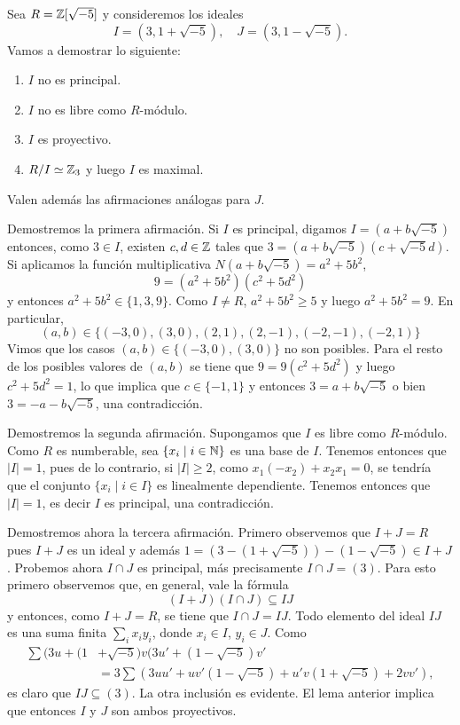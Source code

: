 \begin{example}
	Sea $R=\mathbb{Z}[\sqrt{-5}]$ y consideremos los ideales 
	\[
		I=(3,1+\sqrt{-5}),\quad 
		J=(3,1-\sqrt{-5}).
	\]
	Vamos a demostrar lo siguiente:
	\begin{enumerate}
		\item $I$ no es principal.
		\item $I$ no es libre como $R$-módulo.
		\item $I$ es proyectivo.
		\item $R/I\simeq\mathbb{Z}_3$ y luego $I$ es maximal.
	\end{enumerate}
	Valen además las afirmaciones análogas para $J$.

	Demostremos la primera afirmación. Si $I$ es principal, digamos $I=(a+b\sqrt{-5})$ entonces,
	como $3\in I$, existen $c,d\in\mathbb{Z}$ tales que
	$3=(a+b\sqrt{-5})(c+\sqrt{-5}d)$.  Si aplicamos la función multiplicativa 
	$N(a+b\sqrt{-5})=a^2+5b^2$,
	\[
	9=(a^2+5b^2)(c^2+5d^2)
	\]
	y entonces $a^2+5b^2\in\{1,3,9\}$. Como $I\ne R$,  
	$a^2+5b^2\geq5$ y luego $a^2+5b^2=9$. En particular,
	\[
	(a,b)\in\{(-3,0),(3,0),(2,1),(2,-1),(-2,-1),(-2,1)\}
	\]
	Vimos que los casos $(a,b)\in\{(-3,0),(3,0)\}$ no son posibles. Para el resto de los posibles valores de $(a,b)$ 
	se tiene que 
	$9=9(c^2+5d^2)$ y luego $c^2+5d^2=1$, lo que implica que $c\in\{-1,1\}$ y entonces 
	$3=a+b\sqrt{-5}$ o bien $3=-a-b\sqrt{-5}$, una contradicción. 

	Demostremos la segunda afirmación. Supongamos que $I$ es libre como $R$-módulo. Como 
	$R$ es numberable, sea $\{x_i\mid i\in\mathbb{N}\}$ es una base de $I$. Tenemos entonces
	que $|I|=1$, pues de lo contrario, si $|I|\geq2$, como $x_1(-x_2)+x_2x_1=0$, se
	tendría que el conjunto $\{x_i\mid i\in I\}$ es linealmente
	dependiente. Tenemos entonces que $|I|=1$, es decir $I$ es principal, una contradicción. 
	
	Demostremos ahora la tercera afirmación. Primero observemos que $I+J=R$ pues $I+J$ es un ideal
	y además $1 = (3-(1+\sqrt{-5})) - (1-\sqrt{-5})\in I+J$. Probemos ahora $I\cap J$ es
	principal, más precisamente $I\cap J=(3)$. Para esto primero observemos que,
	en general, vale la fórmula
	\[
		(I+J)(I\cap J)\subseteq IJ
	\]
	y entonces, como $I+J=R$, se tiene que $I\cap J=IJ$. Todo elemento del ideal $IJ$ 
	es una suma finita $\sum_i x_iy_i$, donde $x_i\in I$, $y_i\in J$. Como
	\begin{align*}
		\sum (3u+(1&+\sqrt{-5})v(3u'+(1-\sqrt{-5})v'\\
				&=3\sum (3uu'+uv'(1-\sqrt{-5})+u'v(1+\sqrt{-5})+2vv'),
	\end{align*}
	es claro que $IJ\subseteq (3)$. La otra inclusión es evidente. El lema
	anterior implica que entonces $I$ y $J$ son ambos proyectivos.


\end{example}
